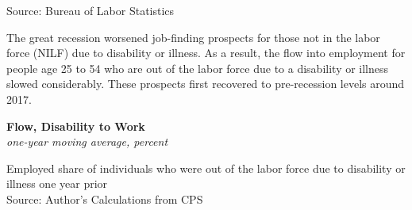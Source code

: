 \documentclass{report}
\makeatletter
\newcommand{\tbllink}[1]{\href{https://raw.githubusercontent.com/bdecon/US-chartbook/master/chartbook/data/#1}{\faTable}}
\newcommand*\short[1]{\expandafter\@gobbletwo\number\numexpr#1\relax}
\newcommand{\shdateaxisticks}{
		date coordinates in=x, axis line style={draw=none},
		xmax={2024-01-31},
		max space between ticks=40,	    
		xtick={{1990-01-01}, {1995-01-01}, {2000-01-01}, 
			{2005-01-01}, {2010-01-01}, {2015-01-01}, {2020-01-01}},
		minor xtick={},
		enlarge y limits={0.06}, enlarge x limits={0.01},
		xticklabel style={align=center, yshift=-2pt}, tick label style={inner sep=0pt},
		}
\newcommand{\bbar}[2]{extra #1 ticks = {{#2}}, extra #1 tick labels = ,
		extra #1 tick style = {grid=major, grid style={thick, black!25}},}
\newcommand{\stdline}[4]{\addplot[very thick, no markers, color=#1] 
		table [x=#2, y=#3, col sep=comma] {#4};	}
\newcommand{\thickline}[4]{\addplot[ultra thick, no markers, color=#1] 
		table [x=#2, y=#3, col sep=comma] {#4};	}
\newcommand{\rebars}{
		\fill[color=black!10] (axis cs:{2007-12-01},\pgfkeysvalueof{/pgfplots/ymin}) 
			rectangle (axis cs:{2009-07-01}, \pgfkeysvalueof{/pgfplots/ymax});
		\fill[color=black!10] (axis cs:{2001-03-01},\pgfkeysvalueof{/pgfplots/ymin}) 
			rectangle (axis cs:{2001-11-01}, \pgfkeysvalueof{/pgfplots/ymax});
		\fill[color=black!10] (axis cs:{2020-02-01},\pgfkeysvalueof{/pgfplots/ymin}) 
			rectangle (axis cs:{2020-05-01}, \pgfkeysvalueof{/pgfplots/ymax});}
\makeatother
\begin{document}
{\begin{minipage}{1.0\textwidth}
\footnotesize{Source: Bureau of Labor Statistics} \hfill \tbllink{lf_flow.csv} \ \tbllink{lf_flow_q.csv}
\vspace{3mm}

\small The great recession worsened job-finding prospects for those not in the labor force (NILF) due to disability or illness. As a result, the flow into employment for people age 25 to 54 who are out of the labor force due to a disability or illness slowed considerably. These prospects first recovered to pre-recession levels around 2017. 
\end{minipage}
\vspace{1mm}

\begin{minipage}{0.29\textwidth}
\small 
\end{minipage} \hspace{5mm} \begin{minipage}{0.44\textwidth}
\normalsize \textbf{Flow, Disability to Work}\\
\footnotesize{\textit{one-year moving average, percent}}
\vspace{3.7cm}

\hspace{2mm} 

\footnotesize{Employed share of individuals who were out of the labor force due to disability or illness one year prior}\\
\footnotesize{Source: Author's Calculations from CPS} \hfill \tbllink{disflow.csv}
\end{minipage}
\newpage
\begin{minipage}{1.0\textwidth}      

\end{minipage}}
\end{document}
